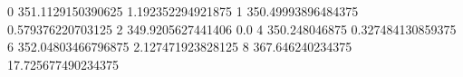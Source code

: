 0 351.1129150390625 1.192352294921875
1 350.49993896484375 0.579376220703125
2 349.9205627441406 0.0
4 350.248046875 0.327484130859375
6 352.04803466796875 2.127471923828125
8 367.646240234375 17.725677490234375
